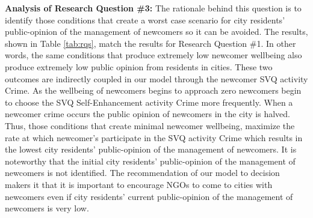 \documentclass{scspaperproc}
\theoremstyle{scsthe}
\begin{document}
{\bf Analysis of Research Question \#3:} The rationale behind this question is to identify those conditions that create a worst case scenario for city residents' public-opinion of the management of newcomers so it can be avoided. The results, shown in Table \ref{tab:rqs}, match the results for Research Question \#1. In other words, the same conditions that produce extremely low newcomer wellbeing also produce extremely low public opinion from residents in cities. These two outcomes are indirectly coupled in our model through the newcomer SVQ activity Crime. As the wellbeing of newcomers begins to approach zero newcomers begin to choose the SVQ Self-Enhancement activity Crime more frequently.  When a newcomer crime occurs the public opinion of newcomers in the city is halved. Thus, those conditions that create minimal newcomer wellbeing, maximize the rate at which newcomer's participate in the SVQ activity Crime which results in the lowest city residents' public-opinion of the management of newcomers. It is noteworthy that the initial city residents' public-opinion of the management of newcomers is not identified. The recommendation of our model to decision makers it that it is important to encourage NGOs to come to cities with newcomers even if city residents' current public-opinion of the management of newcomers is very low. 



\end{document}
